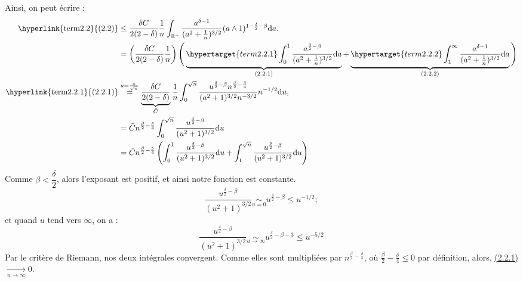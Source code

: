 \documentclass[openany]{book}
\makeatletter
\newcommand{\R}{\mathbb{R}}
\newcommand{\1}{\mathbbm{1}}
\renewcommand{\d}{\mathrm{d}}
\renewenvironment{proof}[1][\textbf{\textit{Démonstration}}]{%
  \par\pushQED{\qed}%
  \normalfont\topsep6\p@\@plus6\p@\relax
  \trivlist\item[\hskip\labelsep
    #1\@addpunct{.}]\ignorespaces
}{%
  \popQED\endtrivlist\@endpefalse
}
\theoremstyle{thmfont}
\theoremstyle{deffont}
\theoremstyle{thmfont}
\theoremstyle{deffont}
\makeatother
\begin{document}
\begin{proof}
    Ainsi, on peut écrire :
    \begin{align*}
      \text{\hyperlink{term2.2}{(2.2)}} &\leq \dfrac{\delta C}{2(2-\delta)}\dfrac{1}{n} \int_{\R^+} \dfrac{a^{\delta-1}}{(a^2 + \frac{1}{n})^{3/2}}(a \wedge 1)^{1-\frac{\delta}{2} - \beta} \d a.\\
              &= \left(\dfrac{\delta C}{2(2-\delta)}\dfrac{1}{n}\right)\Bigg( \underbrace{ \hypertarget{term2.2.1}\int_0^1 \dfrac{a^{\frac{\delta}{2} - \beta}}{(a^2 + \frac{1}{n})^{3/2}} \d a}_{(2.2.1)}
                + \underbrace{ \hypertarget{term2.2.2} \int_1^\infty \dfrac{a^{\delta - 1}}{(a^2 + \frac{1}{n})^{3/2}}\d a}_{(2.2.2)} \Bigg)\\  
      \text{\hyperlink{term2.2.1}{(2.2.1)}} &\overset{a = \frac{u}{\sqrt{n}}}{=} \underbrace{\dfrac{\delta C}{2(2-\delta)}}_{\tilde C}\dfrac{1}{n}  \int_0^{\sqrt{n}} \dfrac{u^{\frac{\delta}{2} - \beta} n^{ \frac{\beta}{2}-\frac{\delta}{4}}}{(a^2 + 1)^{3/2}n^{-3/2}} n^{-1/2}\d u,\\
              &= \tilde C n^{ \frac{\beta}{2}-\frac{\delta}{4}} \int_0^{\sqrt{n}} \dfrac{u^{\frac{\delta}{2} - \beta} }{(u^2 + 1)^{3/2}}\d u\\
              &= \tilde C n^{ \frac{\beta}{2}-\frac{\delta}{4}} \left( \int_0^1 \dfrac{u^{\frac{\delta}{2} - \beta}}{(u^2 + 1)^{3/2}}\d u + \int_1^{\sqrt{n}}\dfrac{u^{\frac{\delta}{2} - \beta}}{(u^2 + 1)^{3/2}}\d u\right)
    \end{align*}
    Comme $\beta<\dfrac{\delta}{2}$, alors l'exposant est positif, et ainsi notre fonction est constante.
    $$\dfrac{u^{\frac{\delta}{2} - \beta}}{(u^2 + 1)^{3/2}} \underset{u = 0}{\sim} u^{\frac{\delta}{2} - \beta} \leq u^{-1/2};$$
    et quand $u$ tend vers $\infty$, on a :
    $$\dfrac{u^{\frac{\delta}{2} - \beta}}{(u^2 + 1)^{3/2}} \underset{u \to \infty}{\sim} u^{\frac{\delta}{2} -\beta -3} \leq u^{-5/2}$$
    Par le critère de Riemann, nos deux intégrales convergent. Comme elles sont multipliées par $n^{ \frac{\beta}{2}-\frac{\delta}{4}}$, où $\frac{\beta}{2}-\frac{\delta}{4} \leq 0$ par définition, alors, \hyperlink{term2.2.1}{(2.2.1)}$\xrightarrow[n \to \infty]{} 0$.


\end{proof}
\end{document}
